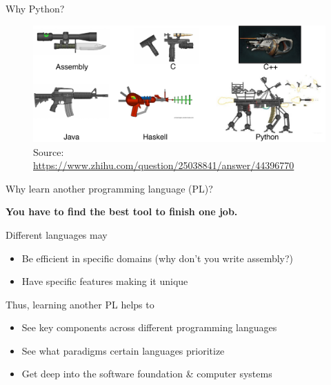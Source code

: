 \documentclass{../TexTemplate/myslide}
\begin{document}
\begin{frame}{Why Python?}
\begin{figure}
\centering
\includegraphics[width=\linewidth]{fig/python-comparison.pdf}
\caption*{\scriptsize Source: \url{https://www.zhihu.com/question/25038841/answer/44396770}}
\end{figure}
\end{frame}

\begin{frame}{Why learn another programming language (PL)?}
\begin{flushleft}
\textbf{You have to find the best tool to finish one job.}
\end{flushleft}
Different languages may
\begin{itemize}
	\item Be efficient in specific domains (why don't you write assembly?)
	\item Have specific features making it unique
\end{itemize}
\pause
\bigskip
Thus, learning another PL helps to
\begin{itemize}
	\item See key components across different programming languages
	\item See what paradigms certain languages prioritize
	\item Get deep into the software foundation \& computer systems %
\end{itemize}
\end{frame}

\end{document}
